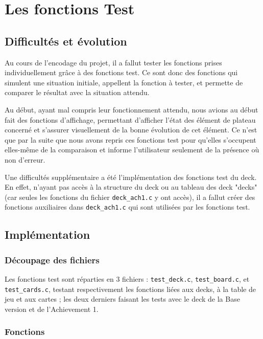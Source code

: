 \chapter{Les fonctions Test}
\section{Difficultés et évolution}

Au cours de l'encodage du projet, il a fallut tester les fonctions prises individuellement grâce à des fonctions test. Ce sont donc des fonctions qui simulent une situation initiale, appellent la fonction à tester, et permette de comparer le résultat avec la situation attendu.

Au début, ayant mal compris leur fonctionnement attendu, nous avions au début fait des fonctions d'affichage, permettant d'afficher l'état des élément de plateau concerné et s'assurer visuellement de la bonne évolution de cet élément. Ce n'est que par la suite que nous avons repris ces fonctions test pour qu'elles s'occupent elles-même de la comparaison et informe l'utilisateur seulement de la présence où non d'erreur.

Une difficultés supplémentaire a été l'implémentation des fonctions test du deck. En effet, n'ayant pas accès à la structure du deck ou au tableau des deck "decks" (car seules les fonctions du fichier \texttt{deck\_ach1.c} y ont accès), il a fallut créer des fonctions auxiliaires dans \texttt{deck\_ach1.c} qui sont utilisées par les fonctions test.

\section{Implémentation}
\subsection{Découpage des fichiers}
Les fonctions test sont réparties en 3 fichiers : \texttt{test\_deck.c}, \texttt{test\_board.c}, et \texttt{test\_cards.c}, testant respectivement les fonctions liées aux decks, à la table de jeu et aux cartes ; les deux derniers faisant les tests avec le deck de la Base version et de l'Achievement 1.

\subsection{Fonctions}
\label{sec3: ftest}

